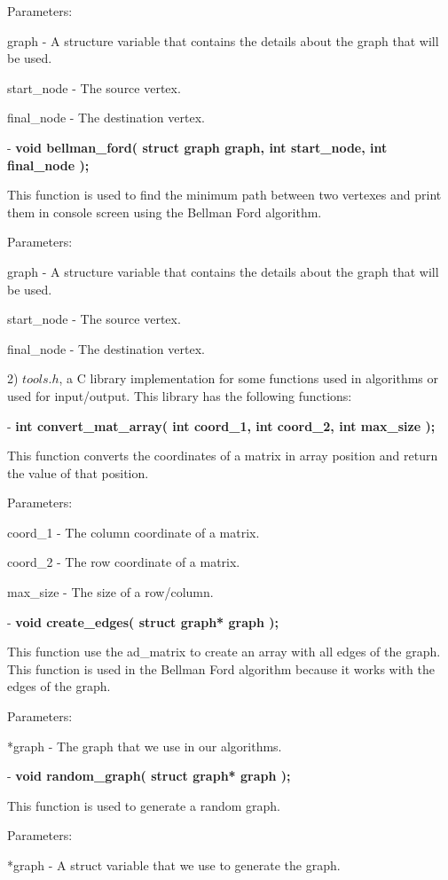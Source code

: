 \documentclass[12]{article}
\begin{document}
Parameters:

        graph - A structure variable that contains the details about the graph that will be used.
        
        start\_node - The source vertex.
        
        final\_node - The destination vertex.
        
- \textbf{void bellman\_ford( struct graph graph, int start\_node, int final\_node );}

This function is used to find the minimum path between two vertexes and print them in console screen using the Bellman Ford algorithm.

Parameters:

    graph - A structure variable that contains the details about the graph that will be used.
    
        start\_node - The source vertex.
        
        final\_node - The destination vertex.
        
2) $tools.h$, a  C library implementation for some functions used in algorithms or used for input/output. This library has the following functions:

- \textbf{int convert\_mat\_array( int coord\_1, int coord\_2, int max\_size );}

This function converts the coordinates of a matrix in array position and return the value of that position.

Parameters:

    coord\_1 - The column coordinate of a matrix.
 
    coord\_2 - The row coordinate of a matrix.

    max\_size - The size of a row/column.

- \textbf{void create\_edges( struct graph* graph );}

This function use the ad\_matrix to create an array with all edges of the graph. This function is used in the Bellman Ford algorithm because it works with the edges of the graph.

    Parameters:
    
    *graph - The graph that we use in our algorithms.
    
- \textbf{void random\_graph( struct graph* graph );}

This function is used to generate a random graph.

    Parameters:
    
    *graph - A struct variable that we use to generate the graph.
\end{document}
